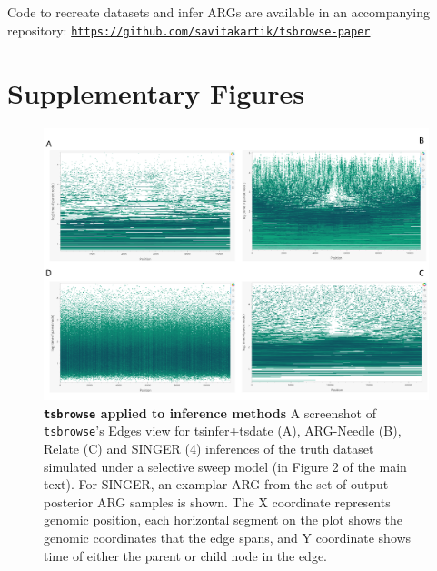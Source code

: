 \documentclass[unnumsec,webpdf,contemporary,large,namedate]{oup-authoring-template}%
\begin{document}
\subsection{}
Code to recreate datasets and infer ARGs are available in an accompanying repository: \texttt{\url{https://github.com/savitakartik/tsbrowse-paper}}.

\clearpage
\section{Supplementary Figures}
\begin{figure}
    \centering
    \includegraphics[width=0.95\linewidth]{manuscript/figures/SuppFig1.png}
    \caption{\textbf{\texttt{tsbrowse} applied to inference methods}
    A screenshot of \texttt{tsbrowse}'s Edges view for tsinfer+tsdate (A), ARG-Needle (B), Relate (C) and SINGER (4) inferences of the truth dataset simulated under a selective sweep model (in Figure 2 of the main text). For SINGER, an examplar ARG from the set of output posterior ARG samples is shown. The X coordinate represents genomic position, each horizontal segment on the plot shows the genomic coordinates that the edge spans, and Y coordinate shows time of either the parent or child node in the edge.}
    \label{fig:Supplementary_Figure_1}
\end{figure}
\end{document}
